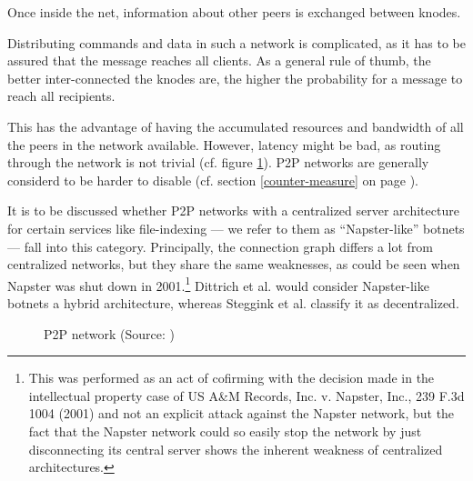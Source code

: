 \documentclass{llncs}
\begin{document}
Once inside the net, information about other peers is
exchanged between knodes.

Distributing commands and data in such a network is complicated, as it
has to be assured that the message reaches all clients. As a general
rule of thumb, the better inter-connected the knodes are, the higher
the probability for a message to reach all recipients.

This has the advantage of having the accumulated resources and
bandwidth of all the peers in the network available. However, latency
might be bad, as routing through the network is not trivial
(cf. figure \ref{p2p-network}). P2P networks are generally considerd
to be harder to disable (cf. section \ref{counter-measure} on page
\pageref{counter-measure}).

It is to be discussed whether P2P networks with a centralized server
architecture for certain services like file-indexing --- we refer to
them as ``Napster-like'' botnets --- fall into this
category. Principally, the connection graph differs a lot from
centralized networks, but they share the same weaknesses, as could be
seen when Napster was shut down in
2001\cite{napsterWiki}.\footnote{This was performed as an act of
  cofirming with the decision made in the intellectual property case
  of US A&M Records, Inc. v. Napster, Inc., 239 F.3d 1004 (2001) and
  not an explicit attack against the Napster network, but the fact
  that the Napster network could so easily stop the network by just
  disconnecting its central server shows the inherent weakness of
  centralized architectures.}  Dittrich et
al. \cite{dittrich2007command} would consider Napster-like botnets a
hybrid architecture, whereas Steggink et al.
\cite{steggink2007detection} classify it as
decentralized. 

\begin{figure}[htbp]
  \centering
  \caption{P2P network (Source: \cite{dittrich2007command})}
  \label{p2p-network}
\end{figure}
\end{document}
